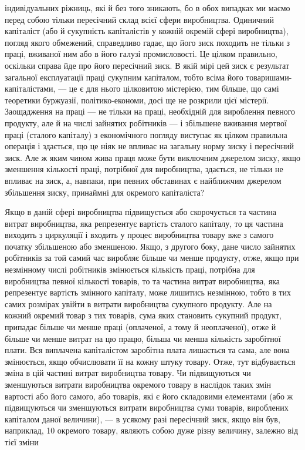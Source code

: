 індивідуальних ріжниць, які й без того зникають, бо в обох
випадках ми маємо перед собою тільки пересічний склад всієї
сфери виробництва. Одиничний капіталіст (або й сукупність капіталістів у кожній окремій сфері
виробництва), погляд якого
обмежений, справедливо гадає, що його зиск походить не тільки
з праці, вживаної ним або в його галузі промисловості. Це цілком правильно, оскільки справа йде про
його пересічний зиск.
В якій мірі цей зиск є результат загальної експлуатації праці
сукупним капіталом, тобто всіма його товаришами-капіталістами, — це є для нього цілковитою
містерією, тим більше, що самі теоретики буржуазії, політико-економи, досі ще не розкрили цієї
містерії. Заощадження на праці — не тільки на праці, необхідній
для вироблення певного продукту, але й на числі зайнятих робітників — і збільшене вживання мертвої
праці (сталого капіталу)
з економічного погляду виступає як цілком правильна операція і здається, що це ніяк не впливає на
загальну норму
зиску і пересічний зиск. Але ж яким чином жива праця може
бути виключним джерелом зиску, якщо зменшення кількості
праці, потрібної для виробництва, здається, не тільки не впливає на зиск, а, навпаки, при певних
обставинах є найближчим
джерелом збільшення зиску, принаймні для окремого капіталіста?

Якщо в даній сфері виробництва підвищується або скорочується та частина витрат виробництва, яка
репрезентує вартість
сталого капіталу, то ця частина виходить з циркуляції і входить
у процес виробництва товару вже з самого початку збільшеною або зменшеною. Якщо, з другого боку,
дане число зайнятих робітників за той самий час виробляє більше чи менше продукту, отже, якщо при
незмінному числі робітників змінюється кількість праці, потрібна для виробництва певної кількості
товарів, то та частина витрат виробництва, яка репрезентує вартість змінного капіталу, може лишитись
незмінною,
тобто в тих самих розмірах увійти в витрати виробництва сукупного продукту. Але на кожний окремий
товар з тих товарів, сума яких становить сукупний продукт, припадає більше чи менше праці
(оплаченої, а тому й неоплаченої), отже й більше
чи менше витрат на цю працю, більша чи менша кількість заробітної плати. Вся виплачена капіталістом
заробітна плата лишається та сама, але вона змінюється, якщо обчислювати її на кожну штуку товару.
Отже, тут відбувається зміна в цій частині
витрат виробництва товару. Чи підвищуються чи зменшуються витрати виробництва окремого товару в
наслідок таких змін вартості
або його самого, або товарів, які є його складовими елементами
(або ж підвищуються чи зменшуються витрати виробництва суми
товарів, вироблених капіталом даної величини), — в усякому
разі пересічний зиск, якщо він був, наприклад, 10%
окремого товару,
являють собою дуже різну величину, залежно від тієї зміни
